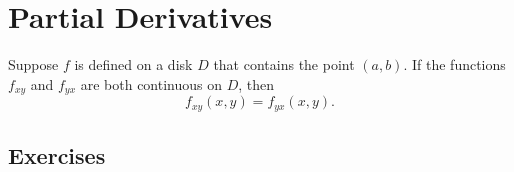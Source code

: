 \section{Partial Derivatives}
\begin{theorem}
	\label{theorem-clairauts-theorem}
	Suppose $f$ is defined on a disk $D$ that contains the point $\left( a, b \right)$. If the functions $f_{xy}$ and $f_{yx}$ are both continuous on $D$, then
	\begin{equation*}
	f_{xy}\left(x,y\right)=f_{yx}\left(x,y\right).
	\end{equation*}
\end{theorem}

\subsection{Exercises}
\setcounter{exercise}{86}

\setcounter{exercise}{90}

\setcounter{exercise}{92}

